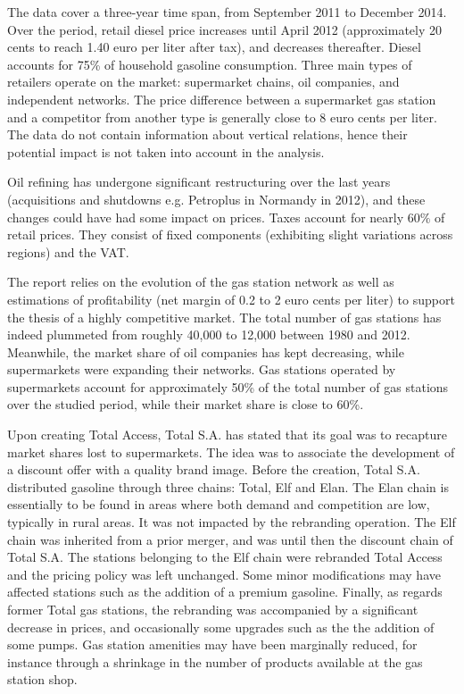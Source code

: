 \documentclass[english]{article}
\begin{document}
The data cover a three-year time span, from September 2011 to December 2014. Over the period, retail diesel price increases until April 2012 (approximately 20 cents to reach 1.40 euro per liter after tax), and decreases thereafter. Diesel accounts for 75\% of household gasoline consumption. Three main types of retailers operate on the market: supermarket chains, oil companies, and independent networks. The price difference between a supermarket gas station and a competitor from another type is generally close to 8 euro cents per liter. The data do not contain information about vertical relations, hence their potential impact is not taken into account in the analysis.

Oil refining has undergone significant restructuring over the last years (acquisitions and shutdowns e.g. Petroplus in Normandy in 2012), and these changes could have had some impact on prices. Taxes account for nearly 60$\%$ of retail prices. They consist of fixed components (exhibiting slight variations across regions) and the VAT.

The \cite{BEL12} report relies on the evolution of the gas station network as well as estimations of profitability (net margin of 0.2 to 2 euro cents per liter) to support the thesis of a highly competitive market. The total number of gas stations has indeed plummeted from roughly 40,000 to 12,000 between 1980 and 2012. Meanwhile, the market share of oil companies has kept decreasing, while supermarkets were expanding their networks. Gas stations operated by supermarkets account for approximately 50\% of the total number of gas stations over the studied period, while their market share is close to 60\%.

Upon creating Total Access, Total S.A. has stated that its goal was to recapture market shares lost to supermarkets. The idea was to associate the development of a discount offer with a quality brand image. Before the creation, Total S.A. distributed gasoline through three chains: Total, Elf and Elan. The Elan chain is essentially to be found in areas where both demand and competition are low, typically in rural areas. It was not impacted by the rebranding operation. The Elf chain was inherited from a prior merger, and was until then the discount chain of Total S.A. The stations belonging to the Elf chain were rebranded Total Access and the pricing policy was left unchanged. Some minor modifications may have affected stations such as the addition of a premium gasoline. Finally, as regards former Total gas stations, the rebranding was accompanied by a significant decrease in prices, and occasionally some upgrades such as the the addition of some pumps. Gas station amenities may have been marginally reduced, for instance through a shrinkage in the number of products available at the gas station shop.
\end{document}
